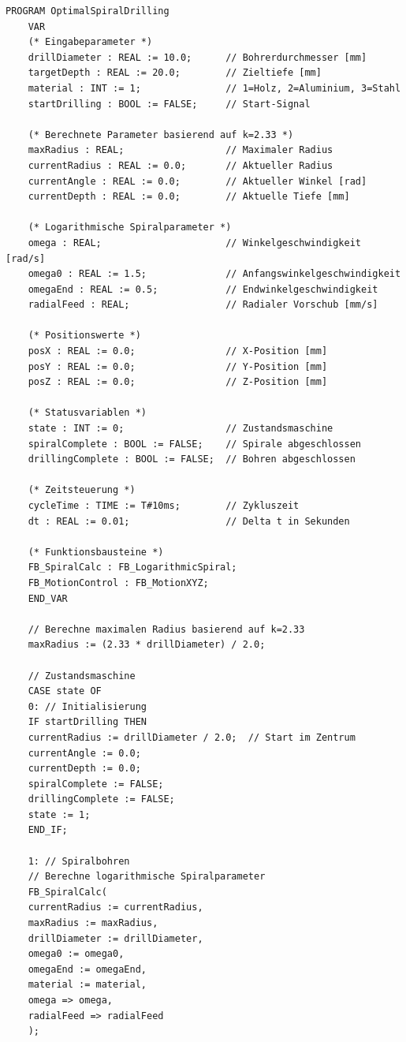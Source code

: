 ﻿\documentclass[12pt,a4paper]{article}
\begin{document}
\begin{lstlisting}[style=structuredtext, caption={Hauptprogramm für optimales Spiralbohren}, label={lst:main}]
	PROGRAM OptimalSpiralDrilling
	VAR
	(* Eingabeparameter *)
	drillDiameter : REAL := 10.0;      // Bohrerdurchmesser [mm]
	targetDepth : REAL := 20.0;        // Zieltiefe [mm]
	material : INT := 1;               // 1=Holz, 2=Aluminium, 3=Stahl
	startDrilling : BOOL := FALSE;     // Start-Signal
	
	(* Berechnete Parameter basierend auf k=2.33 *)
	maxRadius : REAL;                  // Maximaler Radius
	currentRadius : REAL := 0.0;       // Aktueller Radius
	currentAngle : REAL := 0.0;        // Aktueller Winkel [rad]
	currentDepth : REAL := 0.0;        // Aktuelle Tiefe [mm]
	
	(* Logarithmische Spiralparameter *)
	omega : REAL;                      // Winkelgeschwindigkeit [rad/s]
	omega0 : REAL := 1.5;              // Anfangswinkelgeschwindigkeit
	omegaEnd : REAL := 0.5;            // Endwinkelgeschwindigkeit
	radialFeed : REAL;                 // Radialer Vorschub [mm/s]
	
	(* Positionswerte *)
	posX : REAL := 0.0;                // X-Position [mm]
	posY : REAL := 0.0;                // Y-Position [mm]
	posZ : REAL := 0.0;                // Z-Position [mm]
	
	(* Statusvariablen *)
	state : INT := 0;                  // Zustandsmaschine
	spiralComplete : BOOL := FALSE;    // Spirale abgeschlossen
	drillingComplete : BOOL := FALSE;  // Bohren abgeschlossen
	
	(* Zeitsteuerung *)
	cycleTime : TIME := T#10ms;        // Zykluszeit
	dt : REAL := 0.01;                 // Delta t in Sekunden
	
	(* Funktionsbausteine *)
	FB_SpiralCalc : FB_LogarithmicSpiral;
	FB_MotionControl : FB_MotionXYZ;
	END_VAR
	
	// Berechne maximalen Radius basierend auf k=2.33
	maxRadius := (2.33 * drillDiameter) / 2.0;
	
	// Zustandsmaschine
	CASE state OF
	0: // Initialisierung
	IF startDrilling THEN
	currentRadius := drillDiameter / 2.0;  // Start im Zentrum
	currentAngle := 0.0;
	currentDepth := 0.0;
	spiralComplete := FALSE;
	drillingComplete := FALSE;
	state := 1;
	END_IF;
	
	1: // Spiralbohren
	// Berechne logarithmische Spiralparameter
	FB_SpiralCalc(
	currentRadius := currentRadius,
	maxRadius := maxRadius,
	drillDiameter := drillDiameter,
	omega0 := omega0,
	omegaEnd := omegaEnd,
	material := material,
	omega => omega,
	radialFeed => radialFeed
	);
	

\end{lstlisting}
\end{document}
